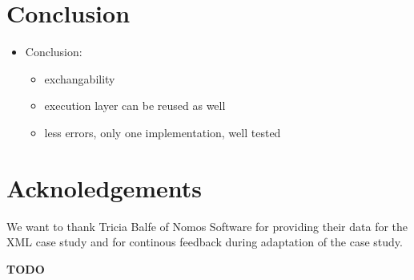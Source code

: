 \section{Conclusion}

\begin{itemize}
  \item Conclusion:
  \begin{itemize}
    \item exchangability
    \item execution layer can be reused as well
    \item less errors, only one implementation, well tested
  \end{itemize}  
\end{itemize}

\section{Acknoledgements}

We want to thank Tricia Balfe of Nomos Software for providing their data for the XML case study and for continous feedback during adaptation of the case study.

\textbf{TODO}